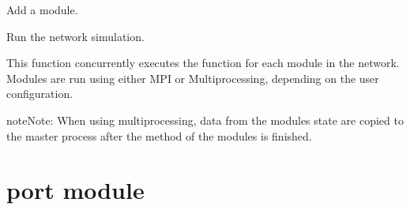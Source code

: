 \documentclass[letterpaper,10pt,openany,oneside,english]{sphinxmanual}
\begin{document}
\begin{fulllineitems}

\begin{fulllineitems}
\label{\detokenize{src_rst/network:network.Network.module}}
Add a module.

\end{fulllineitems}


\begin{fulllineitems}
\end{fulllineitems}


\begin{fulllineitems}
\label{\detokenize{src_rst/network:network.Network.run}}
Run the network simulation.

This function concurrently executes the  function
for each module in the network. Modules are run using either MPI or
Multiprocessing, depending on the user configuration.

\begin{sphinxadmonition}{note}{Note:}
When using multiprocessing, data from the modules state are copied to the master
process after the  method of the modules is finished.
\end{sphinxadmonition}

\end{fulllineitems}


\end{fulllineitems}



\section{port module}
\label{\detokenize{src_rst/port:module-port}}\label{\detokenize{src_rst/port:port-module}}\label{\detokenize{src_rst/port::doc}}
\end{document}
